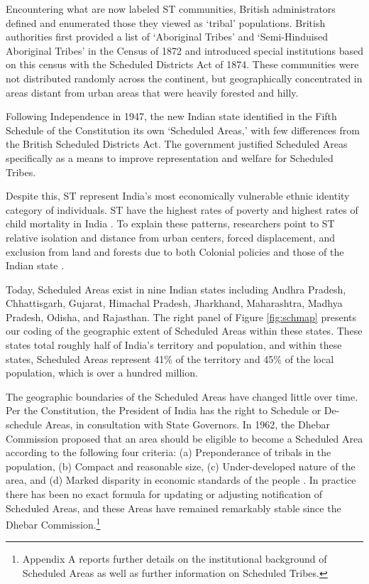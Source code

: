 \documentclass[12pt,reqno]{article}
\begin{document}
Encountering what are now labeled ST communities, British administrators defined and enumerated those they viewed as `tribal' populations. British authorities first provided a list of `Aboriginal Tribes' and `Semi-Hinduised Aboriginal Tribes' in the Census of 1872 \parencite[64]{Corbridge2002} and introduced special institutions  based on this census with the Scheduled Districts Act of 1874. These communities were not distributed randomly across the continent, but geographically concentrated in areas distant from urban areas that were heavily forested and hilly.

Following Independence in 1947, the new Indian state identified in the Fifth Schedule of the Constitution its own `Scheduled Areas,' with few differences from the British Scheduled Districts Act. The government justified Scheduled Areas specifically as a means to improve representation and welfare for Scheduled Tribes. 

Despite this, ST represent India's most economically vulnerable ethnic identity category of individuals. ST have the highest rates of poverty and highest rates of child mortality in India \parencite{WorldBank2011}. To explain these patterns, researchers point to ST relative isolation and distance from urban centers, forced displacement, and exclusion from land and forests due to both Colonial policies and those of the Indian state \parencite{Guha2000,Sundar2007,WorldBank2011}.

Today, Scheduled Areas exist in nine Indian states including Andhra Pradesh, Chhattisgarh, Gujarat, Himachal Pradesh, Jharkhand, Maharashtra, Madhya Pradesh, Odisha, and Rajasthan. The right panel of Figure \ref{fig:schmap}  presents our coding of the geographic extent of Scheduled Areas within these states. These states total roughly half of India's territory and population, and within these states, Scheduled Areas represent 41\% of the territory and 45\% of the local population, which is over a hundred million.%

The geographic boundaries of the Scheduled Areas have changed little over time. Per the Constitution, the President of India has the right to Schedule or De-schedule Areas, in consultation with State Governors. In 1962, the Dhebar Commission proposed that an area should be eligible to become a Scheduled Area according to the following four criteria: (a) Preponderance of tribals in the population, (b) Compact and reasonable size, (c) Under-developed nature of the area, and (d) Marked disparity in economic standards of the people \parencite{Dhebar}. In practice there has been no exact formula for updating or adjusting notification of Scheduled Areas, and these Areas have remained remarkably stable since the Dhebar Commission.\footnote{\textcite{gulzar2019} Appendix A reports further details on the institutional background of Scheduled Areas as well as further information on Scheduled Tribes.}
\end{document}
